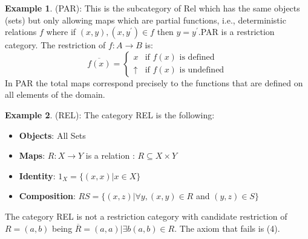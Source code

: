 \documentclass[11pt, oneside]{amsart}
\theoremstyle{definition}
\theoremstyle{definition}
\newtheorem{exmp}{Example}[section]
\begin{document}
\begin{exmp}
(PAR): This is the subcategory of Rel which has the same objects (sets)
but only allowing maps which are partial functions, i.e., deterministic relations $f$ where if $(x,y), (x,y^{\prime}) \in f$ then $y=y^{\prime}$.PAR is a restriction category. The restriction of $f: A \to B$ is:
\begin{equation*}
    \overline{f(x)}=
    \begin{cases}
    x & \text{if $f(x)$ is defined}\\
    \uparrow & \text{if $f(x)$ is undefined}
    \end{cases}
\end{equation*}
In PAR the total maps correspond precisely to the functions that are defined on all elements of the domain.\\
\end{exmp}
\begin{exmp}
(REL): The category REL is the following:
\begin{itemize}
    \item \textbf{Objects}: All Sets
    \item \textbf{Maps}: $R: X \to Y$ is a relation : $R \subseteq X\times{Y}$
    \item \textbf{Identity}: $1_{X}=\{(x,x)|x \in X\}$
    \item \textbf{Composition}: $RS=\{(x,z)|\forall{y}, (x,y)\in R$ and $(y,z) \in  S\}$
\end{itemize}
The category REL is not a restriction category with candidate restriction of $R={(a,b)}$ being $\overline{R}={(a, a)|\exists b (a,b)\in R}$. The axiom that fails is (4).\\
\end{exmp}
\end{document}
